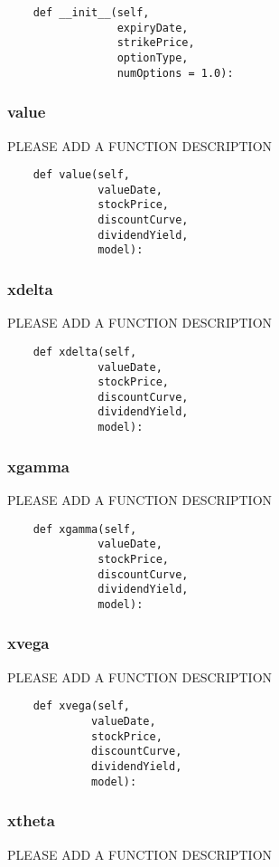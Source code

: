 \documentclass[twoside,11pt]{book}
\begin{document}
\begin{lstlisting}
    def __init__(self,
                 expiryDate,
                 strikePrice,
                 optionType,
                 numOptions = 1.0):
\end{lstlisting}

\subsubsection*{{\bf value}}
PLEASE ADD A FUNCTION DESCRIPTION

\begin{lstlisting}
    def value(self,
              valueDate,
              stockPrice,
              discountCurve,
              dividendYield,
              model):
\end{lstlisting}

\subsubsection*{{\bf xdelta}}
PLEASE ADD A FUNCTION DESCRIPTION

\begin{lstlisting}
    def xdelta(self,
              valueDate,
              stockPrice,
              discountCurve,
              dividendYield,
              model):
\end{lstlisting}

\subsubsection*{{\bf xgamma}}
PLEASE ADD A FUNCTION DESCRIPTION

\begin{lstlisting}
    def xgamma(self,
              valueDate,
              stockPrice,
              discountCurve,
              dividendYield,
              model):
\end{lstlisting}

\subsubsection*{{\bf xvega}}
PLEASE ADD A FUNCTION DESCRIPTION

\begin{lstlisting}
    def xvega(self,
             valueDate,
             stockPrice,
             discountCurve,
             dividendYield,
             model):
\end{lstlisting}

\subsubsection*{{\bf xtheta}}
PLEASE ADD A FUNCTION DESCRIPTION
\end{document}
